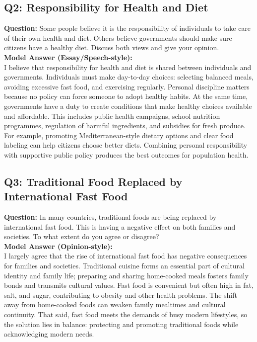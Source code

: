 \documentclass[a4paper,12pt]{article}
\begin{document}
\subsection*{Q2: Responsibility for Health and Diet}
\textbf{Question:} Some people believe it is the responsibility of individuals to take care of their own health and diet. Others believe governments should make sure citizens have a healthy diet. Discuss both views and give your opinion.\\
\textbf{Model Answer (Essay/Speech-style):}\\
I believe that responsibility for health and diet is shared between individuals and governments. Individuals must make day-to-day choices: selecting balanced meals, avoiding excessive fast food, and exercising regularly. Personal discipline matters because no policy can force someone to adopt healthy habits. At the same time, governments have a duty to create conditions that make healthy choices available and affordable. This includes public health campaigns, school nutrition programmes, regulation of harmful ingredients, and subsidies for fresh produce. For example, promoting Mediterranean-style dietary options and clear food labeling can help citizens choose better diets. Combining personal responsibility with supportive public policy produces the best outcomes for population health.

\subsection*{Q3: Traditional Food Replaced by International Fast Food}
\textbf{Question:} In many countries, traditional foods are being replaced by international fast food. This is having a negative effect on both families and societies. To what extent do you agree or disagree?\\
\textbf{Model Answer (Opinion-style):}\\
I largely agree that the rise of international fast food has negative consequences for families and societies. Traditional cuisine forms an essential part of cultural identity and family life; preparing and sharing home-cooked meals fosters family bonds and transmits cultural values. Fast food is convenient but often high in fat, salt, and sugar, contributing to obesity and other health problems. The shift away from home-cooked foods can weaken family mealtimes and cultural continuity. That said, fast food meets the demands of busy modern lifestyles, so the solution lies in balance: protecting and promoting traditional foods while acknowledging modern needs.
\end{document}
